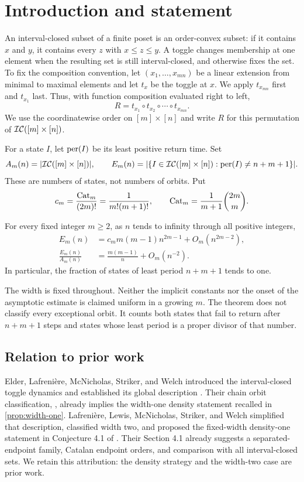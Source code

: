 \section{Introduction and statement}
An interval-closed subset of a finite poset is an order-convex subset: if it contains $x$ and $y$, it contains every $z$ with $x\le z\le y$. A toggle changes membership at one element when the resulting set is still interval-closed, and otherwise fixes the set. To fix the composition convention, let $(x_1,\ldots,x_{mn})$ be a linear extension from minimal to maximal elements and let $t_x$ be the toggle at $x$. We apply $t_{x_{mn}}$ first and $t_{x_1}$ last. Thus, with function composition evaluated right to left,
\[
 R=t_{x_1}\circ t_{x_2}\circ\cdots\circ t_{x_{mn}}.
\] We use the coordinatewise order on $[m]\times[n]$ and write $R$ for this permutation of $\mathcal{IC}([m]\times[n])$.

For a state $I$, let $\operatorname{per}(I)$ be its least positive return time. Set
\[
 A_m(n)=|\mathcal{IC}([m]\times[n])|,\qquad
 E_m(n)=|\{I\in\mathcal{IC}([m]\times[n]):\operatorname{per}(I)\ne n+m+1\}|.
\]
These are numbers of states, not numbers of orbits. Put
\[
 c_m=\frac{\mathrm{Cat}_m}{(2m)!}=\frac1{m!(m+1)!},\qquad
 \mathrm{Cat}_m=\frac1{m+1}\binom{2m}{m}.
\]

\begin{theorem}\label{thm:main}
For every fixed integer $m\ge2$, as $n$ tends to infinity through all positive integers,
\begin{align}
 E_m(n)&=c_m m(m-1)n^{2m-1}+O_m(n^{2m-2}),\label{eq:main-count}\\
 \frac{E_m(n)}{A_m(n)}&=\frac{m(m-1)}n+O_m(n^{-2}).\label{eq:main-ratio}
\end{align}
In particular, the fraction of states of least period $n+m+1$ tends to one.
\end{theorem}

The width is fixed throughout. Neither the implicit constants nor the onset of the asymptotic estimate is claimed uniform in a growing $m$. The theorem does not classify every exceptional orbit. It counts both states that fail to return after $n+m+1$ steps and states whose least period is a proper divisor of that number.

\subsection{Relation to prior work}
Elder, Lafreni\`ere, McNicholas, Striker, and Welch introduced the interval-closed toggle dynamics and established its global description \cite{ELMSW}. Their chain orbit classification, \cite[Theorem 3.2, arXiv v2]{ELMSW}, already implies the width-one density statement recalled in \cref{prop:width-one}. Lafreni\`ere, Lewis, McNicholas, Striker, and Welch simplified that description, classified width two, and proposed the fixed-width density-one statement in Conjecture 4.1 of \cite{LLMSW}. Their Section 4.1 already suggests a separated-endpoint family, Catalan endpoint orders, and comparison with all interval-closed sets. We retain this attribution: the density strategy and the width-two case are prior work.

